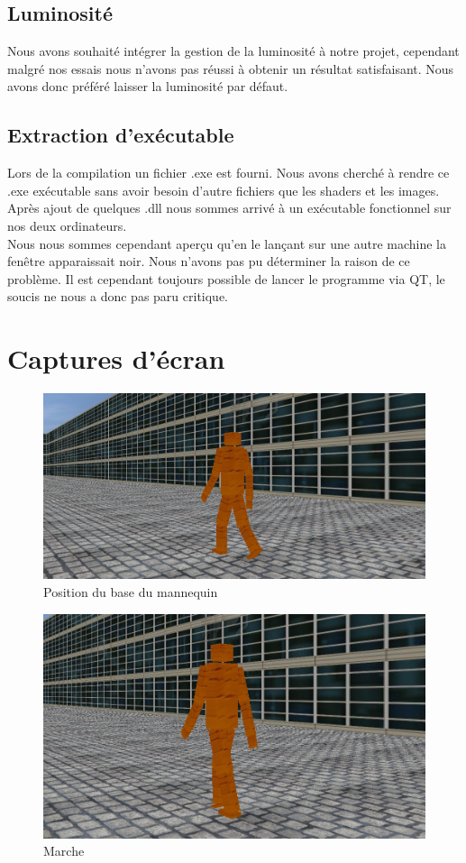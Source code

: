 \documentclass[10pt,a4paper,titlepage]{article}
\begin{document}
\subsection{Luminosité}
Nous avons souhaité intégrer la gestion de la luminosité à notre projet, cependant malgré nos essais nous n'avons pas réussi à obtenir un résultat satisfaisant. Nous avons donc préféré laisser la luminosité par défaut.  

\subsection{Extraction d'exécutable}
Lors de la compilation un fichier .exe est fourni. Nous avons cherché à rendre ce .exe exécutable sans avoir besoin d'autre fichiers que les shaders et les images.\\
Après ajout de quelques .dll nous sommes arrivé à un exécutable fonctionnel sur nos deux ordinateurs.\\
Nous nous sommes cependant aperçu qu'en le lançant sur une autre machine la fenêtre apparaissait noir. Nous n'avons pas pu déterminer la raison de ce problème. Il est cependant toujours possible de lancer le programme via QT, le soucis ne nous a donc pas paru critique.

\section{Captures d'écran}
\begin{figure}[H]
\centering
\includegraphics[width=1\textwidth]{init.png}
\caption{Position du base du mannequin}
\end{figure}

\begin{figure}[H]
\centering
\includegraphics[width=1\textwidth]{walk.png}
\caption{Marche}
\end{figure}
\end{document}
